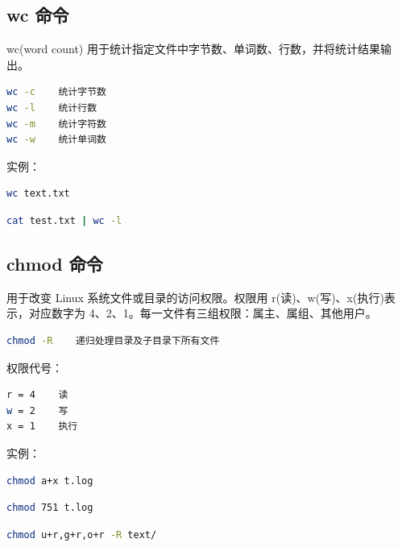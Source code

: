 \documentclass[12pt,a4paper]{ctexbook}
\begin{document}
\subsection{wc 命令}
wc(word count) 用于统计指定文件中字节数、单词数、行数，并将统计结果输出。
\begin{lstlisting}[language=bash,title={wc 常用参数}]
wc -c    统计字节数
wc -l    统计行数
wc -m    统计字符数
wc -w    统计单词数
\end{lstlisting}
实例：
\begin{lstlisting}[language=bash,title={统计文件的 行数 单词数 字节数}]
    wc text.txt
\end{lstlisting}
\begin{lstlisting}[language=bash,title={统计输出的行数}]
    cat test.txt | wc -l
\end{lstlisting}

\subsection{chmod 命令}
用于改变 Linux 系统文件或目录的访问权限。权限用 r(读)、w(写)、x(执行)表示，对应数字为 4、2、1。每一文件有三组权限：属主、属组、其他用户。
\begin{lstlisting}[language=bash,title={chmod 常用参数}]
chmod -R    递归处理目录及子目录下所有文件
\end{lstlisting}
权限代号：
\begin{lstlisting}[language=bash,title={权限数字对应}]
r = 4    读
w = 2    写
x = 1    执行
\end{lstlisting}
实例：
\begin{lstlisting}[language=bash,title={增加文件 t.log 所有用户的可执行权限}]
    chmod a+x t.log
\end{lstlisting}
\begin{lstlisting}[language=bash,title={属主读写执行(7), 属组读执行(5), 其他执行(1)}]
    chmod 751 t.log
\end{lstlisting}
\begin{lstlisting}[language=bash,title={将 test 目录及子目录所有文件添加可读权限}]
    chmod u+r,g+r,o+r -R text/
\end{lstlisting}
\end{document}
